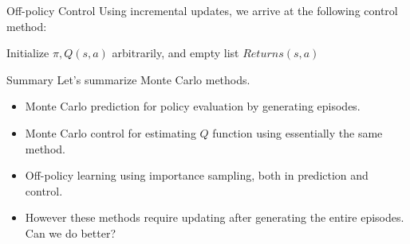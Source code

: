 \documentclass[handout]{beamer}
\begin{document}
\begin{frame}{Off-policy Control}
\small
Using incremental updates, we arrive at the following control method:
\begin{algorithm}[H]
	\caption{Off-policy MC control}
	Initialize $\pi, Q(s, a)$ arbitrarily, and empty list $Returns(s, a)$
	
\end{algorithm}
\end{frame}

\begin{frame}{Summary}
Let's summarize Monte Carlo methods.
	\begin{itemize}[<+(1)->]
		\item Monte Carlo prediction for policy evaluation by generating episodes.
		\item Monte Carlo control for estimating $Q$ function using essentially the same method. 
		\item Off-policy learning using importance sampling, both in prediction and control.
		\item However these methods require updating after generating the entire episodes. Can we do better?
	\end{itemize}
\end{frame}
\end{document}
